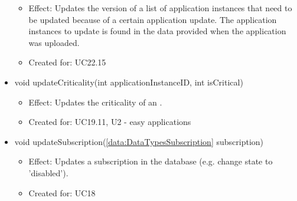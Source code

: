 \begin{description}
\begin{itemize}[noitemsep,nolistsep,leftmargin=-.25cm]
\begin{itemize}[noitemsep,nolistsep]
           \item Effect: Updates the version of a list of application instances that need to be updated because of a certain application update. The application instances to update is found in the data provided when the application was uploaded.
\item Created for: UC22.15
        \end{itemize}
      \item \textsf{void updateCriticality(int applicationInstanceID, int isCritical)}
        \begin{itemize}[noitemsep,nolistsep]
           \item Effect: Updates the criticality of an .
\item Created for: UC19.11, U2 - easy applications
        \end{itemize}
      \item \textsf{void updateSubscription(\ref{data:DataTypesSubscription} subscription)}
        \begin{itemize}[noitemsep,nolistsep]
           \item Effect: Updates a subscription in the database (e.g. change state to 'disabled').
\item Created for: UC18
        \end{itemize}
    \end{itemize}
    \end{description}

